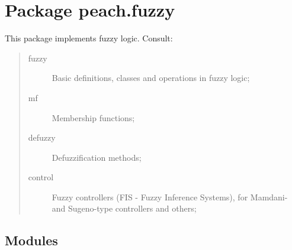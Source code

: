 %
%
%


\section{Package peach.fuzzy}

    \label{peach:fuzzy}

This package implements fuzzy logic. Consult:
\begin{quote}
\begin{description}
\item[{fuzzy}] %

Basic definitions, classes and operations in fuzzy logic;

\item[{mf}] %

Membership functions;

\item[{defuzzy}] %

Defuzzification methods;

\item[{control}] %

Fuzzy controllers (FIS - Fuzzy Inference Systems), for Mamdani- and
Sugeno-type controllers and others;

\end{description}
\end{quote}


\subsection{Modules}

